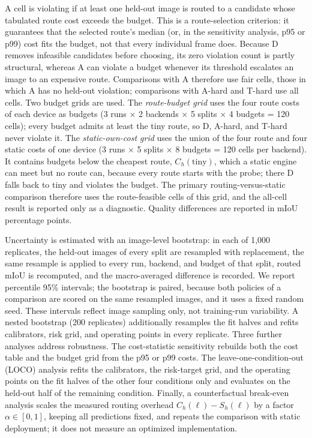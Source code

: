 \documentclass[a4paper,5p]{elsarticle}
\newcommand{\miou}{mIoU}
\begin{document}
A cell is violating if at least one held-out image is routed to a candidate whose tabulated route cost exceeds the budget. This is a route-selection criterion: it guarantees that the selected route's median (or, in the sensitivity analysis, p95 or p99) cost fits the budget, not that every individual frame does. Because D removes infeasible candidates before choosing, its zero violation count is partly structural, whereas A can violate a budget whenever its threshold escalates an image to an expensive route. Comparisons with A therefore use fair cells, those in which A has no held-out violation; comparisons with A-hard and T-hard use all cells. Two budget grids are used. The \emph{route-budget grid} uses the four route costs of each device as budgets (3 runs $\times$ 2 backends $\times$ 5 splits $\times$ 4 budgets = 120 cells); every budget admits at least the tiny route, so D, A-hard, and T-hard never violate it. The \emph{static-own-cost grid} uses the union of the four route and four static costs of one device (3 runs $\times$ 5 splits $\times$ 8 budgets = 120 cells per backend). It contains budgets below the cheapest route, $C_h(\mathrm{tiny})$, which a static engine can meet but no route can, because every route starts with the probe; there D falls back to tiny and violates the budget. The primary routing-versus-static comparison therefore uses the route-feasible cells of this grid, and the all-cell result is reported only as a diagnostic. Quality differences are reported in \miou{} percentage points.

Uncertainty is estimated with an image-level bootstrap: in each of 1,000 replicates, the held-out images of every split are resampled with replacement, the same resample is applied to every run, backend, and budget of that split, routed \miou{} is recomputed, and the macro-averaged difference is recorded. We report percentile 95\% intervals; the bootstrap is paired, because both policies of a comparison are scored on the same resampled images, and it uses a fixed random seed. These intervals reflect image sampling only, not training-run variability. A nested bootstrap (200 replicates) additionally resamples the fit halves and refits calibrators, risk grid, and operating points in every replicate. Three further analyses address robustness. The cost-statistic sensitivity rebuilds both the cost table and the budget grid from the p95 or p99 costs. The leave-one-condition-out (LOCO) analysis refits the calibrators, the risk-target grid, and the operating points on the fit halves of the other four conditions only and evaluates on the held-out half of the remaining condition. Finally, a counterfactual break-even analysis scales the measured routing overhead $C_h(\ell)-S_h(\ell)$ by a factor $\alpha\in[0,1]$, keeping all predictions fixed, and repeats the comparison with static deployment; it does not measure an optimized implementation.
\end{document}
